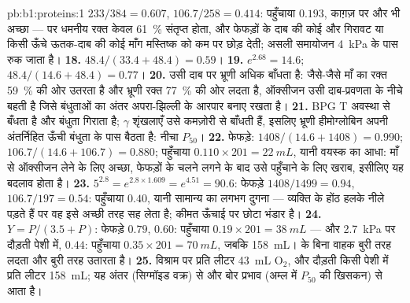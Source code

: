 \begin{solution}{pb:b1:proteins:1}
$233/384 = 0.607$,  $106.7/258 = 0.414$: पहुँचाया $0.193$,
काग़ज़ पर और भी अच्छा --- पर धमनीय रक्त केवल
\qty{61}{\%} संतृप्त होता, और फेफड़ों के दाब की कोई और गिरावट या किसी
ऊँचे ऊतक-दाब की कोई माँग मस्तिष्क को कम पर छोड़ देती; असली समायोजन
\qty{4}{kPa} के पास रुक जाता है।
\textbf{18.} $48.4/(33.4 + 48.4) = 0.59$।
\textbf{19.} $e^{2.68} = 14.6$; $48.4/(14.6 + 48.4) = 0.77$।
\textbf{20.} उसी दाब पर भ्रूणी  अधिक बाँधता है: जैसे-जैसे
माँ का रक्त \qty{59}{\%} की ओर उतरता है और भ्रूणी रक्त
\qty{77}{\%} की ओर लदता है, ऑक्सीजन उसी दाब-प्रवणता के नीचे बहती है
जिसे बंधुताओं का अंतर अपरा-झिल्ली के आरपार बनाए रखता है।
\textbf{21.} BPG T अवस्था से बँधता है और बंधुता गिराता है; $\gamma$
शृंखलाएँ उसे कमज़ोरी से बाँधती हैं, इसलिए भ्रूणी हीमोग्लोबिन अपनी
अंतर्निहित ऊँची बंधुता के पास बैठता है: नीचा $P_{50}$।
\textbf{22.} फेफड़े: $1408/(14.6 + 1408) = 0.990$;  $106.7/(14.6
+ 106.7) = 0.880$; पहुँचाया $0.110\times 201 = \qty{22}{mL}$, यानी
वयस्क का आधा: माँ से ऑक्सीजन लेने के लिए अच्छा, फेफड़ों के चलने लगने के
बाद उसे पहुँचाने के लिए खराब, इसीलिए यह बदलाव होता है।
\textbf{23.} $5^{2.8} = e^{2.8\times 1.609} = e^{4.51} = 90.6$: फेफड़े
$1408/1499 = 0.94$,  $106.7/197 = 0.54$: पहुँचाया $0.40$, यानी
सामान्य का लगभग दुगना --- व्यक्ति के होंठ हलके नीले पड़ते हैं पर वह इसे
अच्छी तरह सह लेता है; कीमत ऊँचाई पर छोटा भंडार है।
\textbf{24.} $Y = P/(3.5 + P)$: फेफड़े $0.79$,  $0.60$: पहुँचाया
$0.19\times 201 = \qty{38}{mL}$ --- और \qty{2.7}{kPa} पर दौड़ती पेशी
में, $0.44$: पहुँचाया $0.35\times 201 = \qty{70}{mL}$, जबकि
\qty{158}{mL}।  के बिना वाहक बुरी तरह लदता और बुरी तरह
उतारता है।
\textbf{25.} विश्राम पर प्रति लीटर \qty{43}{mL} $\mathrm{O_2}$,
और दौड़ती किसी पेशी में प्रति लीटर \qty{158}{mL}; यह अंतर
 (सिग्मॉइड वक्र) से और बोर प्रभाव (अम्ल में $P_{50}$
की खिसकन) से आता है।
\end{solution}
